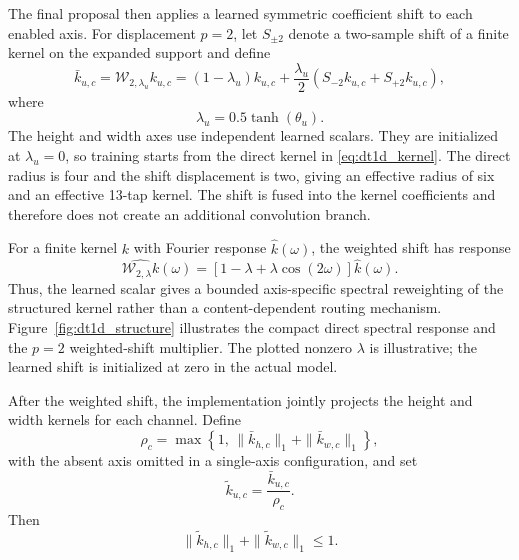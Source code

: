 \documentclass[pdflatex,sn-mathphys-num]{sn-jnl}
\theoremstyle{thmstyleone}
\theoremstyle{thmstyletwo}
\theoremstyle{thmstylethree}
\begin{document}
The final proposal then applies a learned symmetric coefficient shift to each enabled axis. For displacement $p=2$, let $S_{\pm2}$ denote a two-sample shift of a finite kernel on the expanded support and define
\begin{equation}
\bar{k}_{u,c}
=
\mathcal{W}_{2,\lambda_u}k_{u,c}
=
(1-\lambda_u)k_{u,c}
+
\frac{\lambda_u}{2}\left(S_{-2}k_{u,c}+S_{+2}k_{u,c}\right),
\label{eq:dt1d_weighted_shift}
\end{equation}
where
\begin{equation}
\lambda_u=0.5\tanh(\theta_u).
\label{eq:dt1d_shift_lambda}
\end{equation}
The height and width axes use independent learned scalars. They are initialized at $\lambda_u=0$, so training starts from the direct kernel in \eqref{eq:dt1d_kernel}. The direct radius is four and the shift displacement is two, giving an effective radius of six and an effective 13-tap kernel. The shift is fused into the kernel coefficients and therefore does not create an additional convolution branch.

For a finite kernel $k$ with Fourier response $\widehat{k}(\omega)$, the weighted shift has response
\begin{equation}
\widehat{\mathcal{W}_{2,\lambda}k}(\omega)
=
\left[1-\lambda+\lambda\cos(2\omega)\right]\widehat{k}(\omega).
\label{eq:dt1d_weighted_shift_spectrum}
\end{equation}
Thus, the learned scalar gives a bounded axis-specific spectral reweighting of the structured kernel rather than a content-dependent routing mechanism. Figure~\ref{fig:dt1d_structure} illustrates the compact direct spectral response and the $p=2$ weighted-shift multiplier. The plotted nonzero $\lambda$ is illustrative; the learned shift is initialized at zero in the actual model.

After the weighted shift, the implementation jointly projects the height and width kernels for each channel. Define
\begin{equation}
\rho_c
=
\max\!\left\{
1,\,
\|\bar{k}_{h,c}\|_1+\|\bar{k}_{w,c}\|_1
\right\},
\end{equation}
with the absent axis omitted in a single-axis configuration, and set
\begin{equation}
\widetilde{k}_{u,c}
=
\frac{\bar{k}_{u,c}}{\rho_c}.
\label{eq:dt1d_joint_projection}
\end{equation}
Then
\begin{equation}
\|\widetilde{k}_{h,c}\|_1+
\|\widetilde{k}_{w,c}\|_1
\leq1.
\label{eq:dt1d_joint_bound}
\end{equation}
\end{document}
